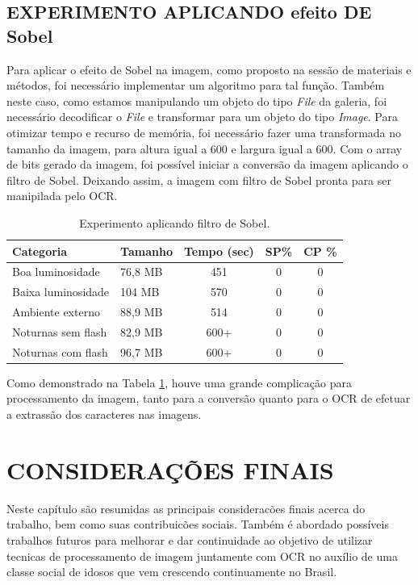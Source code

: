 \section{EXPERIMENTO APLICANDO efeito DE Sobel}

Para aplicar o efeito de Sobel na imagem, como proposto na sessão de materiais e métodos, foi necessário implementar um algoritmo para tal função. Também neste caso, como estamos manipulando um objeto do tipo \textit{File} da galeria, foi necessário decodificar o \textit{File} e transformar para um objeto do tipo \textit{Image}. Para otimizar tempo e recurso de memória, foi necessário fazer uma transformada no tamanho da imagem, para altura igual a 600 e largura igual a 600. Com o array de bits gerado da imagem, foi possível iniciar a conversão da imagem aplicando o filtro de Sobel. Deixando assim, a imagem com filtro de Sobel pronta para ser manipilada pelo OCR. 

\begin{table}[]
\caption{Experimento aplicando filtro de Sobel.}
\label{tab:exp_sobel}
\centering
\begin{tabular}{llccc}
\hline
Categoria          & Tamanho    & Tempo (sec) & SP\%  & CP \% \\ \hline
Boa luminosidade   & 76,8 MB & 451     & 0 & 0         \\
Baixa luminosidade & 104 MB & 570     & 0 & 0         \\
Ambiente externo   & 88,9 MB & 514     & 0 & 0         \\
Noturnas sem flash & 82,9 MB & 600+     & 0& 0         \\
Noturnas com flash & 96,7 MB & 600+     & 0 & 0         \\ \hline
\end{tabular}
\end{table}

Como demonstrado na Tabela \ref{tab:exp_sobel}, houve uma grande complicação para processamento da imagem, tanto para a conversão quanto para o OCR de efetuar a extrassão dos caracteres nas imagens.

\chapter{CONSIDERAÇÕES FINAIS}\label{ch:intro}
Neste capítulo são resumidas as principais consideracões finais acerca do trabalho, bem como suas contribuicões sociais. Também é abordado possíveis trabalhos futuros para melhorar e dar continuidade ao objetivo de utilizar tecnicas de processamento de imagem juntamente com OCR no auxílio de uma classe social de idosos que vem crescendo continuamente no Brasil.


